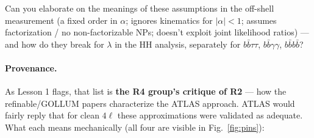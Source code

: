 \documentclass[11pt]{article}
\newcommand{\bbtt}{\ensuremath{b\bar b\tau\tau}}
\newcommand{\bbgg}{\ensuremath{b\bar b\gamma\gamma}}
\newcommand{\fourb}{\ensuremath{b\bar bb\bar b}}
\begin{document}
\begin{qbox}[Question]
Can you elaborate on the meanings of these assumptions in the off-shell measurement (a fixed order in
$\alpha$; ignores kinematics for $|\alpha|<1$; assumes factorization / no non-factorizable NPs; doesn't exploit
joint likelihood ratios) --- and how do they break for $\lambda$ in the HH analysis, separately for \bbtt,
\bbgg, \fourb?
\end{qbox}

\paragraph{Provenance.} As Lesson 1 flags, that list is \textbf{the R4 group's critique of R2} --- how the
refinable/GOLLUM papers characterize the ATLAS approach. ATLAS would fairly reply that for clean $4\ell$ these
approximations were validated as adequate. What each means mechanically (all four are visible in
Fig.~\ref{fig:pins}):
\end{document}

